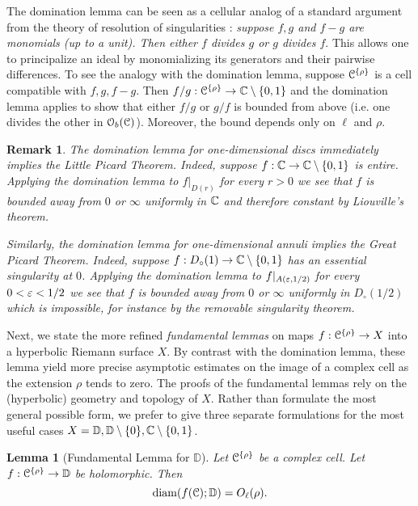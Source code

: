 \documentclass[reqno]{amsart}
\newtheorem*{Lem*}{Lemma}{\bfseries}{\itshape}
\newtheorem{Rem}[Cor]{Remark}{\scshape}{\rmfamily}
\renewcommand\~[1]{\widetilde{#1}}
\def\diam{\operatorname{diam}} \def\ord{\operatorname{ord}}
\def\D{{\mathbb D}}
\def\cO{{\mathcal O}}
\def\rest#1{{\vert_{#1}}} \def\onL{\rest{\cL}}
\def\he#1{{\{#1\}}}
\def\hrho{{\he\rho}}
\begin{document}
The domination lemma can be seen as a cellular analog of a standard
argument from the theory of resolution of singularities
\cite[Lemma~4.7]{bm:subanalytic}: \emph{suppose $f,g$ and $f-g$ are
  monomials (up to a unit). Then either $f$ divides $g$ or $g$ divides
  $f$}. This allows one to principalize an ideal by monomializing its
generators and their pairwise differences. To see the analogy with the
domination lemma, suppose $\cC^\hrho$ is a cell compatible with
$f,g,f-g$. Then $f/g:\cC^\hrho\to\C\setminus\{0,1\}$ and the
domination lemma applies to show that either $f/g$ or $g/f$ is bounded
from above (i.e. one divides the other in $\cO_b(\cC)$). Moreover, the
bound depends only on $\ell$ and $\rho$.

\begin{Rem}
  The domination lemma for one-dimensional discs immediately implies
  the Little Picard Theorem. Indeed, suppose
  $f:{\mathbb C}\to{\mathbb C}\setminus\{0,1\}$ is entire. Applying the domination lemma
  to $f\rest{D(r)}$ for every $r>0$ we see that $f$ is bounded away
  from $0$ or $\infty$ uniformly in ${\mathbb C}$ and therefore constant by
  Liouville's theorem.

  Similarly, the domination lemma for one-dimensional annuli implies
  the Great Picard Theorem. Indeed, suppose
  $f:D_\circ(1)\to{\mathbb C}\setminus\{0,1\}$ has an essential singularity at
  $0$.  Applying the domination lemma to $f\rest{A(\e,1/2)}$ for every
  $0<\varepsilon<1/2$ we see that $f$ is bounded away from $0$ or $\infty$
  uniformly in $D_\circ(1/2)$ which is impossible, for instance by the
  removable singularity theorem.
\end{Rem}

Next, we state the more refined \emph{fundamental lemmas} on maps
$f:\cC^\hrho\to X$ into a hyperbolic Riemann surface $X$. By contrast
with the domination lemma, these lemma yield more precise asymptotic
estimates on the image of a complex cell as the extension $\rho$ tends
to zero. The proofs of the fundamental lemmas rely on the (hyperbolic)
geometry and topology of $X$. Rather than formulate the most general
possible form, we prefer to give three separate formulations for the
most useful cases $X=\D,\D\setminus\{0\},\C\setminus\{0,1\}$.

\begin{Lem*}[Fundamental Lemma for $\D$]
  Let $\cC^\hrho$ be a complex cell. Let $f:\cC^\hrho\to\D$ be
  holomorphic. Then
  \begin{equation}
    \diam(f(\cC);\D)=O_\ell(\rho).
  \end{equation}
\end{Lem*}
\end{document}
